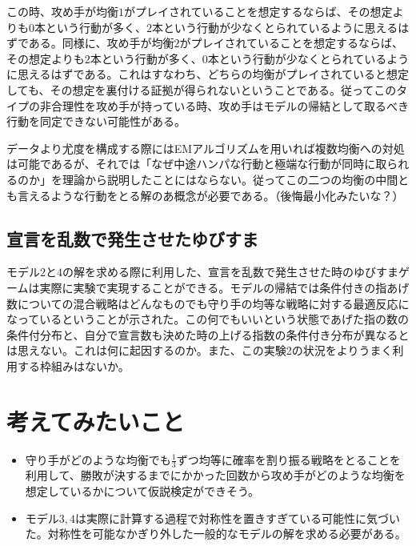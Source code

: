 \documentclass{jsarticle}
\begin{document}
この時、攻め手が均衡$1$がプレイされていることを想定するならば、その想定よりも$0$本という行動が多く、$2$本という行動が少なくとられているように思えるはずである。同様に、攻め手が均衡$2$がプレイされていることを想定するならば、その想定よりも$2$本という行動が多く、$0$本という行動が少なくとられているように思えるはずである。これはすなわち、どちらの均衡がプレイされていると想定しても、その想定を裏付ける証拠が得られないということである。従ってこのタイプの非合理性を攻め手が持っている時、攻め手はモデルの帰結として取るべき行動を同定できない可能性がある。

データより尤度を構成する際にはEMアルゴリズムを用いれば複数均衡への対処は可能であるが、それでは「なぜ中途ハンパな行動と極端な行動が同時に取られるのか」を理論から説明したことにはならない。従ってこの二つの均衡の中間とも言えるような行動をとる解のあ概念が必要である。（後悔最小化みたいな？）

\subsection{宣言を乱数で発生させたゆびすま}
モデル$2$と$4$の解を求める際に利用した、宣言を乱数で発生させた時のゆびすまゲームは実際に実験で実現することができる。モデルの帰結では条件付きの指あげ数についての混合戦略はどんなものでも守り手の均等な戦略に対する最適反応になっているということが示された。この何でもいいという状態であげた指の数の条件付分布と、自分で宣言数も決めた時の上げる指数の条件付き分布が異なるとは思えない。これは何に起因するのか。また、この実験2の状況をよりうまく利用する枠組みはないか。

\section{考えてみたいこと}
\begin{itemize}
	\item 守り手がどのような均衡でも$\frac{1}{3}$ずつ均等に確率を割り振る戦略をとることを利用して、勝敗が決するまでにかかった回数から攻め手がどのような均衡を想定しているかについて仮説検定ができそう。
	\item モデル$3,4$は実際に計算する過程で対称性を置きすぎている可能性に気づいた。対称性を可能なかぎり外した一般的なモデルの解を求める必要がある。
\end{itemize}
\end{document}
